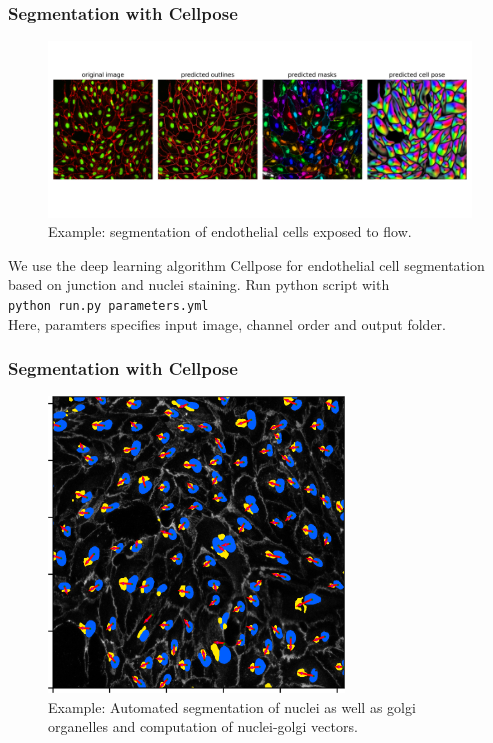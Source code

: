 \documentclass[14pt]{beamer}
\begin{document}
\begin{frame}[plain]
\frametitle{\normalsize \bf Segmentation with Cellpose}


\tiny
\begin{figure}
  \centering
  \includegraphics[width=1.0\textwidth]{images/segmentation-example.png}\\
  \tiny
  Example: segmentation of endothelial cells exposed to flow.
\end{figure}


We use the deep learning algorithm Cellpose for endothelial cell segmentation based on junction and nuclei staining. Run python script with\\[0.5cm]
    \texttt{python run.py parameters.yml} \\[0.5cm]
Here, paramters specifies input image, channel order and output folder.

\end{frame}

\begin{frame}[plain]
\frametitle{\normalsize \bf Segmentation with Cellpose}

\centering

\tiny
\begin{figure}
  \centering
  \includegraphics[width=0.7\textwidth]{images/image_001_nuclei_golgi_vector.png}\\
  \tiny
  Example: Automated segmentation of nuclei as well as golgi organelles and computation of nuclei-golgi vectors.
\end{figure}

\end{frame}
\end{document}
